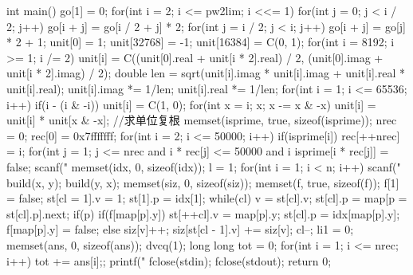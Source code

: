 int main()
{
	go[1] = 0;
	for(int i = 2; i <= pw2lim; i <<= 1)
	{
		for(int j = 0; j < i / 2; j++)
		{
			go[i + j] = go[i / 2 + j] * 2;
		}
		for(int j = i / 2; j < i; j++)
		{
			go[i + j] = go[j] * 2 + 1;
		}
	}
	unit[0] = 1;
	unit[32768] = -1;
	unit[16384] = C(0, 1);
	for(int i = 8192; i >= 1; i /= 2)
	{
		unit[i] = C((unit[0].real + unit[i * 2].real) / 2, (unit[0].imag + unit[i * 2].imag) / 2);
		double len = sqrt(unit[i].imag * unit[i].imag + unit[i].real * unit[i].real);
		unit[i].imag *= 1/len; unit[i].real *= 1/len;
	}
	for(int i = 1; i <= 65536; i++)
	{
		if(i - (i & -i))
		{
			unit[i] = C(1, 0);
			for(int x = i; x; x -= x & -x)
			{
				unit[i] = unit[i] * unit[x & -x];
			}
		}
	}//求单位复根
	memset(isprime, true, sizeof(isprime));
	nrec = 0; rec[0] = 0x7fffffff;
	for(int i = 2; i <= 50000; i++)
	{
		if(isprime[i]) rec[++nrec] = i;
		for(int j = 1; j <= nrec and i * rec[j] <= 50000 and i %
			isprime[i * rec[j]] = false;
	}
	scanf("%
	memset(idx, 0, sizeof(idx));
	l = 1;
	for(int i = 1; i < n; i++)
	{
		scanf("%
		build(x, y);
		build(y, x);
	}
	memset(siz, 0, sizeof(siz));
	memset(f, true, sizeof(f));
	f[1] = false;
	st[cl = 1].v = 1;
	st[1].p = idx[1];
	while(cl)
	{
		v = st[cl].v;
		st[cl].p = map[p = st[cl].p].next;
		if(p)
		{
			if(f[map[p].y])
			{
				st[++cl].v = map[p].y;
				st[cl].p = idx[map[p].y];
				f[map[p].y] = false;
			}
		}else
		{
			siz[v]++;
			siz[st[cl - 1].v] += siz[v];
			cl--;
		}
	}
	li1 = 0;
	memset(ans, 0, sizeof(ans));
	dvcq(1);
	long long tot = 0;
	for(int i = 1; i <= nrec; i++) tot += ans[i];;
	printf("%
	fclose(stdin);
	fclose(stdout);
	return 0;
}

